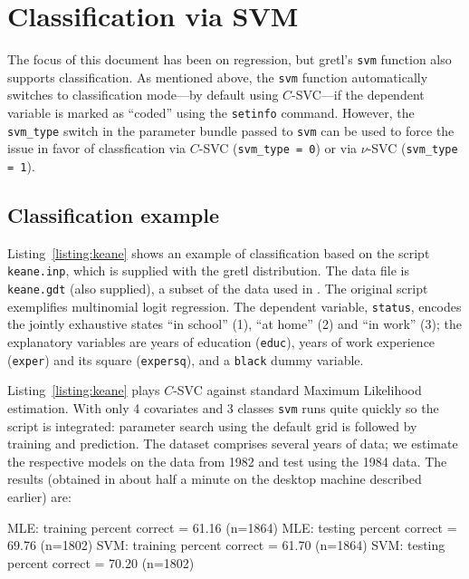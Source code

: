 \documentclass{article}
\begin{document}
\section{Classification via SVM}
\label{sec:SVC}

The focus of this document has been on regression, but gretl's
\texttt{svm} function also supports classification. As mentioned
above, the \texttt{svm} function automatically switches to
classification mode---by default using $C$-SVC---if the dependent
variable is marked as ``coded'' using the \texttt{setinfo} command.
However, the \texttt{svm\_type} switch in the parameter bundle passed
to \texttt{svm} can be used to force the issue in favor of
classfication via $C$-SVC (\texttt{svm\_type = 0}) or via $\nu$-SVC
(\texttt{svm\_type = 1}).

\subsection{Classification example}
\label{sec:SVC-example}

Listing~\ref{listing:keane} shows an example of classification based
on the script \texttt{keane.inp}, which is supplied with the gretl
distribution. The data file is \texttt{keane.gdt} (also supplied), a
subset of the data used in \cite{keane97}. The original script
exemplifies multinomial logit regression. The dependent variable,
\texttt{status}, encodes the jointly exhaustive states ``in school''
(1), ``at home'' (2) and ``in work'' (3); the explanatory variables
are years of education (\texttt{educ}), years of work experience
(\texttt{exper}) and its square (\texttt{expersq}), and a
\texttt{black} dummy variable.

Listing~\ref{listing:keane} plays $C$-SVC against standard Maximum
Likelihood estimation. With only 4 covariates and 3 classes
\texttt{svm} runs quite quickly so the script is integrated: parameter
search using the default grid is followed by training and
prediction. The dataset comprises several years of data; we estimate
the respective models on the data from 1982 and test using the 1984
data. The results (obtained in about half a minute on the desktop
machine described earlier) are:
\begin{code}
MLE: training percent correct = 61.16 (n=1864)
MLE: testing percent correct  = 69.76 (n=1802)
SVM: training percent correct = 61.70 (n=1864)
SVM: testing percent correct  = 70.20 (n=1802)
\end{code}
\end{document}
